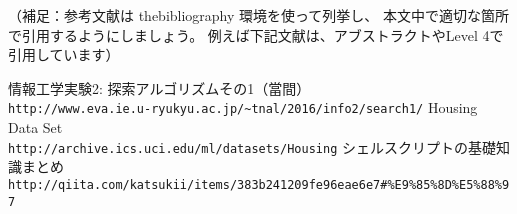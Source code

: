 \documentclass[uplatex,10pt]{jsarticle}
\begin{document}
\vspace{+1.0cm}
（補足：参考文献は thebibliography 環境を使って列挙し、
本文中で適切な箇所で引用するようにしましょう。
例えば下記文献は、アブストラクトやLevel 4で引用しています）
\begin{thebibliography}{99}
情報工学実験2: 探索アルゴリズムその1（當間）\\
\verb|http://www.eva.ie.u-ryukyu.ac.jp/~tnal/2016/info2/search1/|
Housing Data Set\\
\verb|http://archive.ics.uci.edu/ml/datasets/Housing|
シェルスクリプトの基礎知識まとめ\\
\verb+http://qiita.com/katsukii/items/383b241209fe96eae6e7#%E9%85%8D%E5%88%97+
\end{thebibliography}
\end{document}

